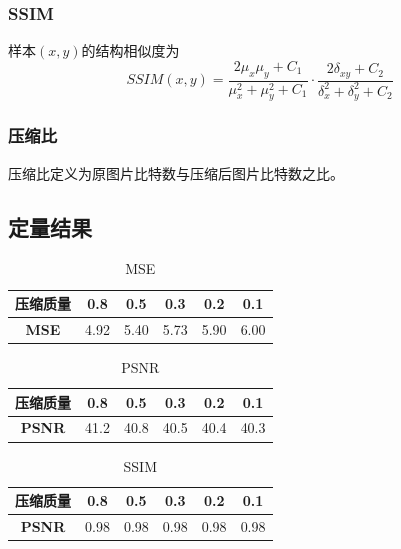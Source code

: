 \subsubsection{SSIM}
样本$(x,y)$的结构相似度为
\begin{equation}
    SSIM(x,y)=\frac{2\mu_x\mu_y+C_1}{\mu_x^2+\mu_y^2+C_1}\cdot\frac{2\delta_{xy}+C_2}{\delta_x^2+\delta_y^2+C_2}
    \label{Eq.SSIM}
\end{equation}

\subsubsection{压缩比}

压缩比定义为原图片比特数与压缩后图片比特数之比。



\subsection{定量结果}

\begin{table}[h!]
    \begin{center}
        \caption{MSE}
        \begin{tabular}{c|ccccc}
            \textbf{压缩质量} & 0.8 & 0.5 & 0.3 & 0.2 & 0.1 \\
            \hline
            \textbf{MSE} & 4.92 & 5.40 & 5.73 & 5.90 & 6.00 \\
        \end{tabular}
    \end{center}
\end{table}


\begin{table}[h!]
    \begin{center}
        \caption{PSNR}
        \begin{tabular}{c|ccccc}
            \textbf{压缩质量} & 0.8 & 0.5 & 0.3 & 0.2 & 0.1 \\
            \hline
            \textbf{PSNR} & 41.2 & 40.8 & 40.5 & 40.4 & 40.3 \\
        \end{tabular}
    \end{center}
\end{table}

\begin{table}[h!]
    \begin{center}
        \caption{SSIM}
        \begin{tabular}{c|ccccc}
            \textbf{压缩质量} & 0.8 & 0.5 & 0.3 & 0.2 & 0.1 \\
            \hline
            \textbf{PSNR} & 0.98 & 0.98 & 0.98 & 0.98 & 0.98 \\
        \end{tabular}
    \end{center}
\end{table}



